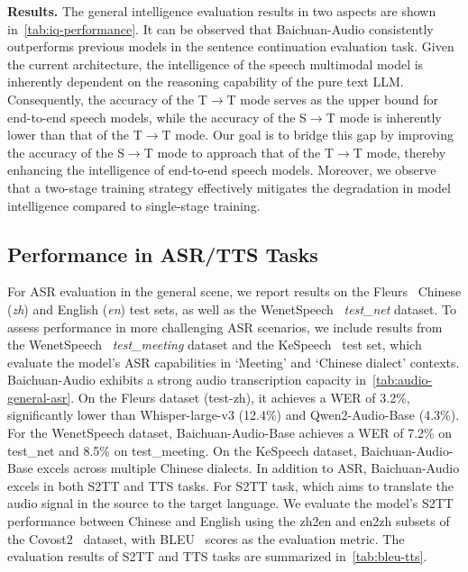 
\textbf{Results.}
The general intelligence evaluation results in two aspects are shown in~\autoref{tab:iq-performance}. It can be observed that Baichuan-Audio consistently outperforms previous models in the sentence continuation evaluation task. Given the current architecture, the intelligence of the speech multimodal model is inherently dependent on the reasoning capability of the pure text LLM. Consequently, the accuracy of the T$\to$T mode serves as the upper bound for end-to-end speech models, while the accuracy of the S$\to$T mode is inherently lower than that of the T$\to$T mode. Our goal is to bridge this gap by improving the accuracy of the S$\to$T mode to approach that of the T$\to$T mode, thereby enhancing the intelligence of end-to-end speech models. Moreover, we observe that a two-stage training strategy effectively mitigates the degradation in model intelligence compared to single-stage training.



\subsection{Performance in ASR/TTS Tasks}
For ASR evaluation in the general scene, we report results on the Fleurs~\citep{fleurs2022arxiv} Chinese (\textit{zh}) and English (\textit{en}) test sets, as well as the WenetSpeech~\citep{zhang2022wenetspeech10000hoursmultidomain} \textit{test\_net} dataset. To assess performance in more challenging ASR scenarios,  we include results from the WenetSpeech~\citep{zhang2022wenetspeech10000hoursmultidomain} \textit{test\_meeting} dataset and the KeSpeech~\citep{tang2021kespeech} test set, which evaluate the model's ASR capabilities in `Meeting' and `Chinese dialect' contexts. Baichuan-Audio exhibits a strong audio transcription capacity in~\autoref{tab:audio-general-asr}. On the Fleurs dataset (test-zh), it achieves a WER of 3.2\%, significantly lower than Whisper-large-v3 (12.4\%) and Qwen2-Audio-Base (4.3\%). For the WenetSpeech dataset, Baichuan-Audio-Base achieves a WER of 7.2\% on test\_net and 8.5\% on test\_meeting. On the KeSpeech dataset, Baichuan-Audio-Base excels across multiple Chinese dialects. In addition to ASR, Baichuan-Audio excels in both S2TT and TTS tasks. For S2TT task, which aims to translate the audio signal in the source to the target language. We evaluate the model's S2TT performance between Chinese and English using the zh2en and en2zh subsets of the Covost2~\citep{wang2020covost2massivelymultilingual} dataset, with BLEU~\citep{papineni-etal-2002-bleu} scores as the evaluation metric. The evaluation results of S2TT and TTS tasks are summarized in~\autoref{tab:bleu-tts}. 





